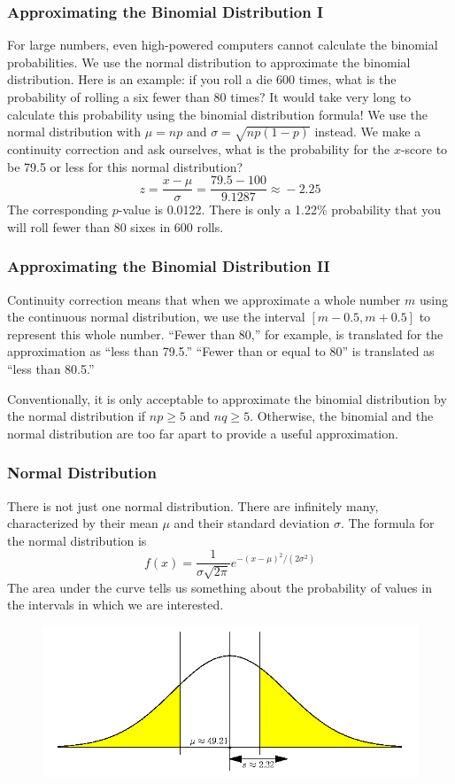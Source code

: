 \documentclass[xcolor=dvipsnames]{beamer}
\begin{document}
\begin{frame}
  \frametitle{Approximating the Binomial Distribution I}
For large numbers, even high-powered computers cannot calculate the
binomial probabilities. We use the normal distribution to approximate
the binomial distribution. Here is an example: if you roll a die 600
times, what is the probability of rolling a six fewer than 80 times? It
would take very long to calculate this probability using the binomial
distribution formula! We use the normal distribution with $\mu=np$ and
$\sigma=\sqrt{np(1-p)}$ instead. We make a \alert{continuity
  correction} and ask ourselves, what is the probability for the
$x$-score to be 79.5 or less for this normal distribution?
\begin{equation}
  \label{eq:oolojuth}
  z=\frac{x-\mu}{\sigma}=\frac{79.5-100}{9.1287}\approx{}-2.25
\end{equation}
The corresponding $p$-value is 0.0122. There is only a 1.22\%
probability that you will roll fewer than 80 sixes in 600 rolls.
\end{frame}

\begin{frame}
  \frametitle{Approximating the Binomial Distribution II}
Continuity correction means that when we approximate a whole number $m$
using the continuous normal distribution, we use the interval
$[m-0.5,m+0.5]$ to represent this whole number. ``Fewer than 80,'' for
example, is translated for the approximation as ``less than 79.5.''
``Fewer than or equal to 80'' is translated as ``less than 80.5.''

Conventionally, it is only acceptable to approximate the binomial
distribution by the normal distribution if $np\geq{}5$ and
$nq\geq{}5$. Otherwise, the binomial and the normal distribution are
too far apart to provide a useful approximation.
\end{frame}

\begin{frame}
  \frametitle{Normal Distribution}
There is not just one normal distribution. There are infinitely many,
characterized by their \alert{mean $\mu$} and their \alert{standard deviation
$\sigma$}. The formula for the normal distribution is
\begin{equation}
  \label{eq:aitoolah}
  f(x)=\frac{1}{\sigma\sqrt{2\pi}}e^{-(x-\mu)^{2}/(2\sigma^{2})}
\end{equation}
The area under the curve tells us something about the probability of
values in the intervals in which we are interested.
  \begin{figure}[h]
    \includegraphics[scale=.4]{./qfour.png}
  \end{figure}
\end{frame}
\end{document}
